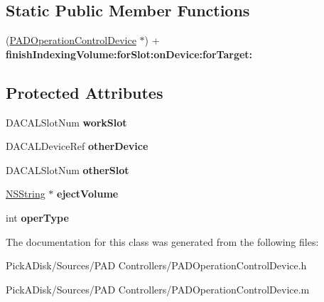 \subsection*{Static Public Member Functions}
\begin{DoxyCompactItemize}
\item 
\hypertarget{interface_p_a_d_operation_control_device_adcc7c45e653351d96e6ac6f656491047}{
(\hyperlink{interface_p_a_d_operation_control_device}{PADOperationControlDevice} $\ast$) + {\bfseries finishIndexingVolume:forSlot:onDevice:forTarget:}}
\label{interface_p_a_d_operation_control_device_adcc7c45e653351d96e6ac6f656491047}

\end{DoxyCompactItemize}
\subsection*{Protected Attributes}
\begin{DoxyCompactItemize}
\item 
\hypertarget{interface_p_a_d_operation_control_device_a7aaafc42aed7b6a099f558aa7611a24a}{
DACALSlotNum {\bfseries workSlot}}
\label{interface_p_a_d_operation_control_device_a7aaafc42aed7b6a099f558aa7611a24a}

\item 
\hypertarget{interface_p_a_d_operation_control_device_adc1c52f2aa989501941d9fe4ae9f37bb}{
DACALDeviceRef {\bfseries otherDevice}}
\label{interface_p_a_d_operation_control_device_adc1c52f2aa989501941d9fe4ae9f37bb}

\item 
\hypertarget{interface_p_a_d_operation_control_device_a9ec2b360a02f3163a9dbf2b84e9a9476}{
DACALSlotNum {\bfseries otherSlot}}
\label{interface_p_a_d_operation_control_device_a9ec2b360a02f3163a9dbf2b84e9a9476}

\item 
\hypertarget{interface_p_a_d_operation_control_device_af5e69e16396fd82f799a24efa0b0decf}{
\hyperlink{class_n_s_string}{NSString} $\ast$ {\bfseries ejectVolume}}
\label{interface_p_a_d_operation_control_device_af5e69e16396fd82f799a24efa0b0decf}

\item 
\hypertarget{interface_p_a_d_operation_control_device_a770650113500133a278e24fd5f54b791}{
int {\bfseries operType}}
\label{interface_p_a_d_operation_control_device_a770650113500133a278e24fd5f54b791}

\end{DoxyCompactItemize}


The documentation for this class was generated from the following files:\begin{DoxyCompactItemize}
\item 
PickADisk/Sources/PAD Controllers/PADOperationControlDevice.h\item 
PickADisk/Sources/PAD Controllers/PADOperationControlDevice.m\end{DoxyCompactItemize}
